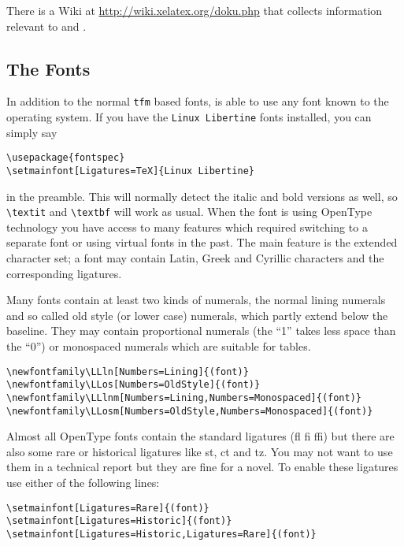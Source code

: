 There is a Wiki at \url{http://wiki.xelatex.org/doku.php} that collects
information relevant to  and .

\subsection{The Fonts}

In addition to the normal \texttt{tfm} based fonts,  is able
to use any font known to the operating system. If you have the \texttt{Linux
Libertine} fonts installed, you can simply say

\begin{code}
\begin{verbatim}
\usepackage{fontspec}
\setmainfont[Ligatures=TeX]{Linux Libertine}
\end{verbatim}
\end{code}
%
in the preamble. This will normally detect the italic and bold versions as
well, so \verb|\textit| and \verb|\textbf| will work as usual. When the
font is using OpenType technology you have access to many features which
required switching to a separate font or using virtual fonts in the past.
The main feature is the extended character set; a font may contain Latin,
Greek and Cyrillic characters and the corresponding ligatures.

Many fonts contain at least two kinds of numerals, the normal lining
numerals and so called old style (or lower case) numerals, which partly
extend below the baseline. They may contain proportional numerals (the ``1''
takes less space than the ``0'') or monospaced numerals which are suitable
for tables.

\begin{code}
\begin{verbatim}
\newfontfamily\LLln[Numbers=Lining]{(font)}
\newfontfamily\LLos[Numbers=OldStyle]{(font)}
\newfontfamily\LLlnm[Numbers=Lining,Numbers=Monospaced]{(font)}
\newfontfamily\LLosm[Numbers=OldStyle,Numbers=Monospaced]{(font)}
\end{verbatim}
\end{code}

Almost all OpenType fonts contain the standard ligatures (fl fi ffi) but
there are also some rare or historical ligatures like st, ct and tz. You may
not want to use them in a technical report but they are fine for a novel. To
enable these ligatures use either of the following lines:

\begin{code}
\begin{verbatim}
\setmainfont[Ligatures=Rare]{(font)}
\setmainfont[Ligatures=Historic]{(font)}
\setmainfont[Ligatures=Historic,Ligatures=Rare]{(font)}
\end{verbatim}
\end{code}

